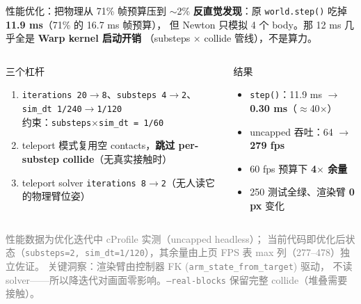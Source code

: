 \documentclass[aspectratio=169, 11pt]{beamer}
\begin{document}
\begin{frame}{性能优化：把物理从 71\% 帧预算压到 $\sim$2\%}
\textbf{反直觉发现}：原 \texttt{world.step()} 吃掉 \textbf{11.9 ms}（71\% 的 16.7 ms 帧预算），
但 Newton 只模拟 4 个 body。那 12 ms 几乎全是 \textbf{Warp kernel 启动开销}
（substeps $\times$ collide 管线），不是算力。

\vspace{6pt}
\begin{columns}[T]
\begin{block}{三个杠杆}
\footnotesize
\begin{enumerate}
\item \texttt{iterations 20$\to$8}、\texttt{substeps 4$\to$2}、\texttt{sim\_dt 1/240$\to$1/120}\\
  \scriptsize 约束：\texttt{substeps$\times$sim\_dt = 1/60}
\item teleport 模式复用空 contacts，\textbf{跳过 per-substep collide}（无真实接触时）
\item teleport solver \texttt{iterations 8$\to$2}（无人读它的物理臂位姿）
\end{enumerate}
\end{block}

\begin{block}{结果}
\footnotesize
\begin{itemize}
\item \texttt{step()}：11.9 ms $\to$ \textbf{0.30 ms}（\textcolor{urcyan}{$\approx$40$\times$}）
\item uncapped 吞吐：64 $\to$ \textbf{279 fps}
\item 60 fps 预算下 \textbf{4$\times$ 余量}
\item 250 测试全绿、渲染臂 \textbf{0 px} 变化
\end{itemize}
\end{block}
\end{columns}

\vspace{2pt}
\footnotesize\textcolor{gray}{性能数据为优化迭代中 cProfile 实测（uncapped headless）；
当前代码即优化后状态（\texttt{substeps=2, sim\_dt=1/120}），其余量由上页 FPS
表 max 列（277--478）独立佐证。}
\vspace{2pt}
\footnotesize\textcolor{gray}{关键洞察：渲染臂由控制器 FK (\texttt{arm\_state\_from\_target}) 驱动，
不读 solver——所以降迭代对画面零影响。\texttt{--real-blocks} 保留完整 collide（堆叠需要接触）。}
\end{frame}
\end{document}
